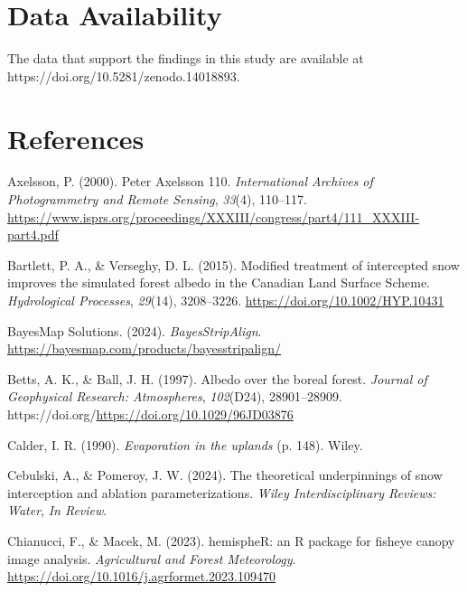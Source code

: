 \documentclass[
  letterpaper,
  DIV=11,
  numbers=noendperiod]{scrartcl}
\newlength{\cslhangindent}
\newenvironment{CSLReferences}[2] %
 {\begin{list}{}{%
  \setlength{\itemindent}{0pt}
  \setlength{\leftmargin}{0pt}
  \setlength{\parsep}{0pt}
  \ifodd #1
   \setlength{\leftmargin}{\cslhangindent}
   \setlength{\itemindent}{-1\cslhangindent}
  \fi
  \setlength{\itemsep}{#2\baselineskip}}}
 {\end{list}}
\begin{document}
\section{Data Availability}\label{data-availability}

The data that support the findings in this study are available at
https://doi.org/10.5281/zenodo.14018893.

\pagebreak

\section{References}\label{references}

\label{refs}
\begin{CSLReferences}{1}{0}
Axelsson, P. (2000). {Peter Axelsson 110}. \emph{International Archives
of Photogrammetry and Remote Sensing}, \emph{33}(4), 110--117.
\url{https://www.isprs.org/proceedings/XXXIII/congress/part4/111_XXXIII-part4.pdf}

Bartlett, P. A., \& Verseghy, D. L. (2015). {Modified treatment of
intercepted snow improves the simulated forest albedo in the Canadian
Land Surface Scheme}. \emph{Hydrological Processes}, \emph{29}(14),
3208--3226. \url{https://doi.org/10.1002/HYP.10431}

BayesMap Solutions. (2024). \emph{{BayesStripAlign}}.
\url{https://bayesmap.com/products/bayesstripalign/}

Betts, A. K., \& Ball, J. H. (1997). {Albedo over the boreal forest}.
\emph{Journal of Geophysical Research: Atmospheres}, \emph{102}(D24),
28901--28909. https://doi.org/\url{https://doi.org/10.1029/96JD03876}

Calder, I. R. (1990). \emph{{Evaporation in the uplands}} (p. 148).
Wiley.

Cebulski, A., \& Pomeroy, J. W. (2024). {The theoretical underpinnings
of snow interception and ablation parameterizations}. \emph{Wiley
Interdisciplinary Reviews: Water}, \emph{In Review}.

Chianucci, F., \& Macek, M. (2023). {hemispheR: an R package for fisheye
canopy image analysis}. \emph{Agricultural and Forest Meteorology}.
\url{https://doi.org/10.1016/j.agrformet.2023.109470}


\end{CSLReferences}
\end{document}
